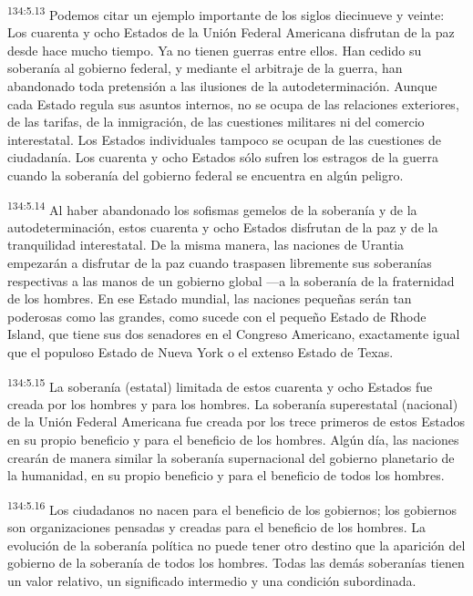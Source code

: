\par
\textsuperscript{134:5.13} Podemos citar un ejemplo importante de los siglos diecinueve y veinte: Los cuarenta y ocho Estados de la Unión Federal Americana disfrutan de la paz desde hace mucho tiempo. Ya no tienen guerras entre ellos. Han cedido su soberanía al gobierno federal, y mediante el arbitraje de la guerra, han abandonado toda pretensión a las ilusiones de la autodeterminación. Aunque cada Estado regula sus asuntos internos, no se ocupa de las relaciones exteriores, de las tarifas, de la inmigración, de las cuestiones militares ni del comercio interestatal. Los Estados individuales tampoco se ocupan de las cuestiones de ciudadanía. Los cuarenta y ocho Estados sólo sufren los estragos de la guerra cuando la soberanía del gobierno federal se encuentra en algún peligro.

\par
\textsuperscript{134:5.14} Al haber abandonado los sofismas gemelos de la soberanía y de la autodeterminación, estos cuarenta y ocho Estados disfrutan de la paz y de la tranquilidad interestatal. De la misma manera, las naciones de Urantia empezarán a disfrutar de la paz cuando traspasen libremente sus soberanías respectivas a las manos de un gobierno global ---a la soberanía de la fraternidad de los hombres. En ese Estado mundial, las naciones pequeñas serán tan poderosas como las grandes, como sucede con el pequeño Estado de Rhode Island, que tiene sus dos senadores en el Congreso Americano, exactamente igual que el populoso Estado de Nueva York o el extenso Estado de Texas.

\par
\textsuperscript{134:5.15} La soberanía (estatal) limitada de estos cuarenta y ocho Estados fue creada por los hombres y para los hombres. La soberanía superestatal (nacional) de la Unión Federal Americana fue creada por los trece primeros de estos Estados en su propio beneficio y para el beneficio de los hombres. Algún día, las naciones crearán de manera similar la soberanía supernacional del gobierno planetario de la humanidad, en su propio beneficio y para el beneficio de todos los hombres.

\par
\textsuperscript{134:5.16} Los ciudadanos no nacen para el beneficio de los gobiernos; los gobiernos son organizaciones pensadas y creadas para el beneficio de los hombres. La evolución de la soberanía política no puede tener otro destino que la aparición del gobierno de la soberanía de todos los hombres. Todas las demás soberanías tienen un valor relativo, un significado intermedio y una condición subordinada.

